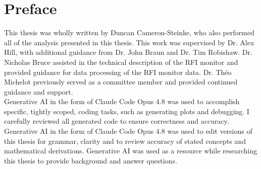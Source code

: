 \renewcommand{\abstractname}{Lay Summary}

\begin{abstract}
The Canadian Hydrogen Observatory and Radio-transient Detector \\(CHORD) is a radio telescope under construction at the Dominion Radio Astrophysical Observatory (DRAO) near Penticton, British Columbia. A scientific goal for the telescope is to map the extremely faint radio waves originating from distant gas clouds in our Milky Way Galaxy. To accomplish this, the telescope must be extremely sensitive at specific radio frequencies. In this thesis, we analyze which frequencies are usable by CHORD and which are corrupted by interference from terrestrial radio emitters. We calculate the theoretical sensitivity which we expect CHORD to achieve and provide data processing strategies that can improve sensitivity. We study the impact of adding additional antennas to CHORD and propose a design which optimizes scientific outcomes. Finally, we compare the expected performance of CHORD to previously published surveys and find that CHORD is likely to be more precise, likely allowing for new scientific discoveries.
\end{abstract}

\chapter{Preface}
This thesis was wholly written by Duncan Cameron-Steinke, who also performed all of the analysis presented in this thesis. This work was supervised by Dr. Alex Hill, with additional guidance from Dr. John Braun and Dr. Tim Robishaw. Dr. Nicholas Bruce assisted in the technical description of the RFI monitor and provided guidance for data processing of the RFI monitor data. Dr. Théo Michelot previously served as a committee member and provided continued guidance and support.\\

Generative AI in the form of Claude Code Opus 4.8 was used to accomplish specific, tightly scoped, coding tasks, such as generating plots and debugging. I carefully reviewed all generated code to ensure correctness and accuracy. Generative AI in the form of Claude Code Opus 4.8 was used to edit versions of this thesis for grammar, clarity and to review accuracy of stated concepts and mathematical derivations. Generative AI was used as a resource while researching this thesis to provide background and answer questions.\\

